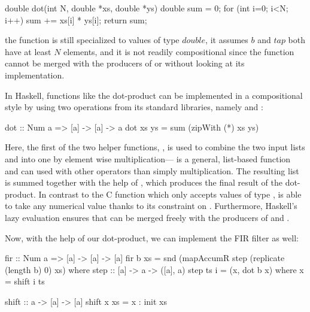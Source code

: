 \documentclass[../main.tex]{subfiles}
\begin{document}
\begin{code}
double dot(int N, double *xs, double *ys)
{
  double sum = 0;
  for (int i=0; i<N; i++) sum += xs[i] * ys[i];
  return sum;
}
\end{code}

\noindent the function is still specialized to values of type $double$, it assumes $b$ and $tap$ both have at least $N$ elements, and it is not readily compositional since the function cannot be merged with the producers of  or  without looking at its implementation.

In Haskell, functions like the dot-product can be implemented in a compositional style by using two operations from its standard libraries, namely  and :

\begin{code}
dot :: Num a => [a] -> [a] -> a
dot xs ys = sum (zipWith (*) xs ys)
\end{code}

\noindent Here, the first of the two helper functions, , is used to combine the two input lists  and  into one by element wise multiplication--- is a general, list-based function and can used with other operators than simply multiplication. The resulting list is summed together with the help of , which produces the final result of the dot-product. In contrast to the C function which only accepts values of type ,  is able to take any numerical value thanks to its  constraint on . Furthermore, Haskell's lazy evaluation ensures that  can be merged freely with the producers of  and .

Now, with the help of our dot-product, we can implement the FIR filter as well:

\begin{code}
fir :: Num a => [a] -> [a] -> [a]
fir b xs = snd (mapAccumR step (replicate (length b) 0) xs)
  where
    step :: [a] -> a -> ([a], a)
    step ts i = (x, dot b x)
      where x = shift i ts
  
    shift :: a -> [a] -> [a]
    shift x xs = x : init xs
\end{code}
\end{document}
